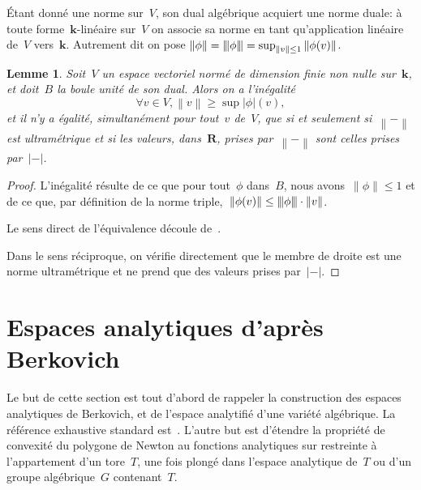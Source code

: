 \documentclass[french]{amsart}
\newcommand{\kk}{\mathbf{k}}
\newcommand{\abs}[1]{{\left|{#1}\right|}}
\newcommand{\Nm}[1]{{\left\|{#1}\right\|}}
\newcommand{\R}{\mathbf{R}}
\newcommand{\NM}[1]{{\left\vert\kern-0.25ex\left\vert\kern-0.25ex\left\vert #1 
    \right\vert\kern-0.25ex\right\vert\kern-0.25ex\right\vert}}
\newtheorem{lemme}{Lemme}[section]
\begin{document}
Étant donné une norme sur~$V$, son dual algébrique acquiert une norme duale: à toute forme~$\kk$-linéaire sur~$V$ on associe  sa  norme
 en tant qu'application linéaire de~$V$ vers~$\kk$. Autrement dit on pose
$\Nm{\phi}=\NM{\phi}=\sup_{\Nm{v}\leq 1}\Nm{\phi(v)}$.

\begin{lemme}\label{LemmeC1} Soit~$V$ un espace vectoriel normé de dimension finie non nulle sur~$\kk$, et doit~$B$ la boule unité de son dual. Alors on a l'inégalité
\[
\forall v\in V, \Nm{v}\geq\sup\abs{\phi}(v),
\]
et il n'y a égalité, simultanément pour tout~$v$ de~$V$, que si et seulement si~$\Nm{-}$ est ultramétrique et si les valeurs, dans~$\R$, prises par~$\Nm{-}$ sont celles prises par~$\abs{-}$.
\end{lemme}
\begin{proof}
L'inégalité résulte de ce que pour tout~$\phi$ dans~$B$, nous avons~$\Nm{\phi}\leq 1$ et de ce que, par définition de la norme triple,~$\Nm{\phi(v)}\leq\NM{\phi}\cdot\Nm{v}$.
 

Le sens direct de l'équivalence découle de~\cite[II §1, Prop. 4 (p. 26)]{Wei74}.

Dans le sens réciproque, on vérifie directement que le membre de droite est une norme ultramétrique et ne prend que des valeurs prises par~$\abs{-}$.
\end{proof}

\section{Espaces analytiques d'après Berkovich}\label{sectionD}
Le but de cette section est tout d'abord de rappeler la construction des espaces analytiques de Berkovich, et de l'espace analytifié d'une variété algébrique. La référence exhaustive standard est~\cite{Ber90}.
L'autre but est d'étendre la propriété de convexité du polygone de Newton au fonctions analytiques sur restreinte à l'appartement d'un tore~$T$, une fois plongé dans l'espace analytique de~$T$ ou d'un groupe algébrique~$G$ contenant~$T$.
\end{document}
